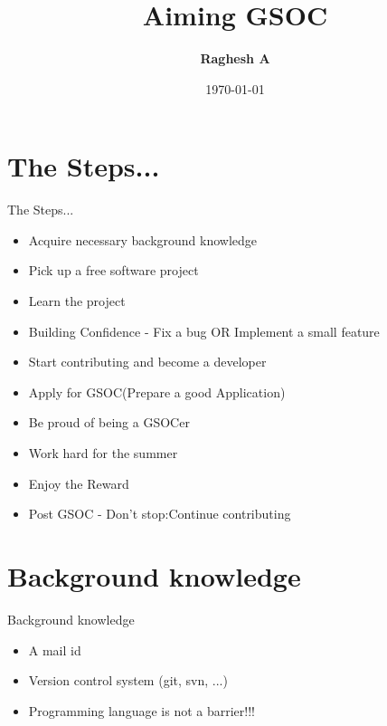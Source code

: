 \documentclass{beamer}
\title{Aiming GSOC}
\author{\textbf{Raghesh A}}
\date{\today}
\begin{document}
\begin{frame}
\titlepage
\end{frame}

\section[Outline]{}
\frame{\tableofcontents}

\section{The Steps...}
\begin{frame}{The Steps...}
\begin{itemize}
\item Acquire necessary background knowledge
\item Pick up a free software project
\item Learn the project
\item Building Confidence - Fix a bug OR Implement a small feature
\item Start contributing and become a developer
\item Apply for GSOC(Prepare a good Application)
\item Be proud of being a GSOCer
\item Work hard for the summer
\item Enjoy the Reward
\item Post GSOC - Don't stop:Continue contributing
\end{itemize}
\end{frame}

\section{Background knowledge}
\begin{frame}{Background knowledge}
\begin{itemize}
\item A mail id
\item Version control system (git, svn, ...)
\item Programming language is not a barrier!!!
\end{itemize}
\end{frame}
\end{document}
